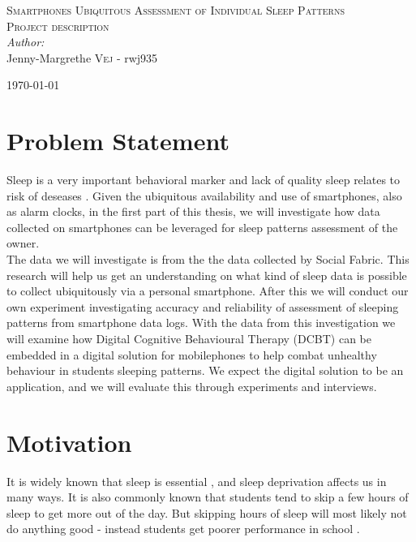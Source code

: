 \documentclass[12pt]{article}
\begin{document}

\begin{center}
\textsc{\Large Smartphones Ubiquitous Assessment of Individual Sleep Patterns}\\[0.5cm] 
\textsc{\large Project description}\\[0.5cm] 


\emph{Author:}
\\
Jenny-Margrethe \textsc{Vej} - rwj935\\ 
\vspace{10mm}

{\large \today}\\[3cm] 
\end{center}
\vspace{-20mm}

\section{Problem Statement}
Sleep is a very important behavioral marker and lack of quality sleep relates to risk of deseases
 \cite{Gumbiner2012}. Given the ubiquitous availability and use of smartphones, also as alarm 
 clocks, in the first part of this thesis, we will investigate how data collected on smartphones 
 can be leveraged for sleep patterns assessment of the owner. \\

The data we will investigate is from the the data collected by Social 
Fabric\cite{Stopczynski2014}. This research will help us get an understanding on what kind of 
sleep data is possible to collect ubiquitously via a personal smartphone. After this 
we will conduct our own experiment investigating accuracy and reliability of assessment of 
sleeping patterns from smartphone data logs.  
With the data from this investigation we will examine how Digital Cognitive Behavioural Therapy 
(DCBT) can be embedded in a digital solution for mobilephones to help combat unhealthy behaviour in 
students sleeping patterns. We expect the digital solution to be an application, and we will evaluate
this through experiments and interviews. 

\section{Motivation}
It is widely known that sleep is essential \cite{Gumbiner2012}, and sleep deprivation affects 
us in many ways. It is also commonly known that students tend to skip a few hours of sleep to 
get more out of the day. But skipping hours of sleep will most likely not do anything good - instead
students get poorer performance in school \cite{Gilbert2010}. \\
\end{document}
